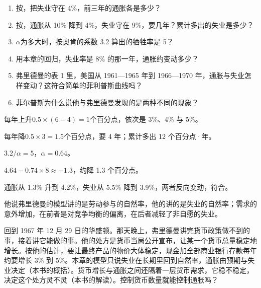 \begin{selfcheck}
\begin{enumerate}
\item 按，把失业守在 4\%，前三年的通胀各是多少？
\item 按，通胀从 10\% 降到 4\%，失业守在 9\%，要几年？累计多出的失业是多少？
\item $\alpha$为多大时，按奥肯的系数 3.2 算出的牺牲率是 5？
\item 用本章的回归，失业率是 8\% 的那一年，通胀约变动多少？
\item 弗里德曼的表 1 里，美国从 1961—1965 年到 1966—1970 年，通胀与失业怎样变动？这符合简单的菲利普斯曲线吗？
\item 菲尔普斯为什么说他与弗里德曼发现的是两种不同的现象？
\end{enumerate}
\end{selfcheck}

\begin{answers}
\item 每年上升$0.5\times(6-4)=1$个百分点，依次是 3\%、4\% 与 5\%。
\item 每年降$0.5\times3=1.5$个百分点，要 4 年；累计多出 12 个百分点·年。
\item $3.2/\alpha=5$，$\alpha=0.64$。
\item $4.64-0.74\times8\approx-1.3$，约降 1.3 个百分点。
\item 通胀从 1.3\% 升到 4.2\%，失业从 5.5\% 降到 3.9\%，两者反向变动，符合。
\item 他说弗里德曼的模型讲的是劳动参与的自然率，他的讲的是失业的自然率；需求的意外增加，在前者是对竞争均衡的偏离，在后者减轻了非自愿的失业。
\end{answers}

回到 1967 年 12 月 29 日的华盛顿。那天晚上，弗里德曼讲完货币政策做不到的事，接着讲它能做的事\cite{friedman1968}。他的处方是货币当局公开宣布，让某一个货币总量稳定地增长\cite{friedman1968}。按他的估计，要让最终产品的物价大体稳定，现金加全部商业银行存款每年约要增长 3\% 到 5\%\cite{friedman1968}。本章的模型只说失业在长期里回到自然率，通胀由预期与失业决定（本书的概括）。货币增长与通胀之间还隔着一层货币需求，它稳不稳定，决定这个处方灵不灵（本书的解读）。控制货币数量就能控制通胀吗？

